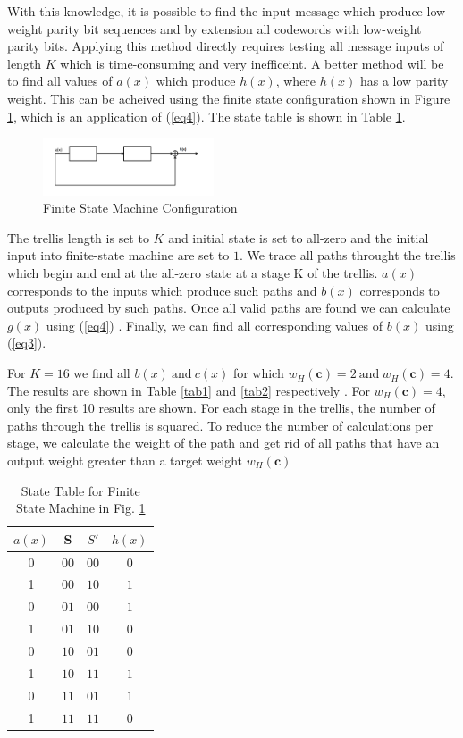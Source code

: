 \documentclass[conference]{IEEEtran}
\begin{document}
 With this knowledge, it is possible to find the input message which produce low-weight parity bit sequences and by extension all codewords  with low-weight parity bits. Applying this method directly requires testing all message inputs of length $K$ which is time-consuming and very inefficeint. A better method will be to find all values of $a(x)$ which produce $h(x)$, where $h(x)$ has a low parity weight. This can be acheived using the finite state configuration shown in Figure \ref{fig2}, which is an application of (\ref{eq4}). The state table is shown in Table \ref{tab3}. 
 
\begin{figure}[h]
\centering
		\includegraphics[width=0.45\textwidth]{fsm.png}
		\caption{Finite State Machine Configuration}
		\label{fig2}
		\end{figure}
		
		
		
		The trellis length is set to $K$ and initial state is set to all-zero and the initial input into finite-state machine are set to $1$.  We trace all paths throught the trellis which begin and end at the all-zero state at a stage K of the trellis. $a(x)$ corresponds to the inputs which produce such paths and $b(x)$ corresponds to outputs produced by such paths. Once all valid paths are found we can calculate $g(x)$ using (\ref{eq4}) . Finally, we can find all corresponding values of $b(x)$ using (\ref{eq3}).
 
 For $K=16$ we find all $b(x) ~\text{and}~ c(x)$ for which $w_H(\textbf{c})=2 ~\text{and} ~ w_H(\textbf{c})=4$. The results are shown in Table \ref{tab1} and \ref{tab2} respectively . For $w_H(\textbf{c})=4$, only the first 10 results are shown. 
  For each stage in the trellis, the number of paths through the trellis is squared. To reduce the number of calculations per stage, we calculate the weight of the path and get rid of all paths that have an output weight greater than a target weight $w_H(\textbf{c})$
  \begin{table}[h!]
 
 \caption{State Table for Finite State Machine in Fig. \ref{fig2}}
\centering
 \begin{tabular}{c c c c} 
 \hline
 $a(x)$ & S & $S'$ & $h(x)$ \\ [0.5ex] 
 \hline\hline
 0 & $0 0 $& $0 0$ & $0$\\ 
  1& $0 0$ & $1 0$ & $1$ \\
  0 & $0 1$& $0 0$ & $1$ \\
  1& $0 1$& $1 0$& $0$ \\
  0& $1 0$ & $0 1$ & $0$ \\
 1 & $1 0 $ & $1 1$ & $1$\\ 
 0 & $1 1$ & $0 1$ & $1$ \\ 
 1 & $1 1$ & $1 1$ & $0$ \\ [1ex] 
 \hline
 \end{tabular}
 \label{tab3}
\end{table}
 
\end{document}
